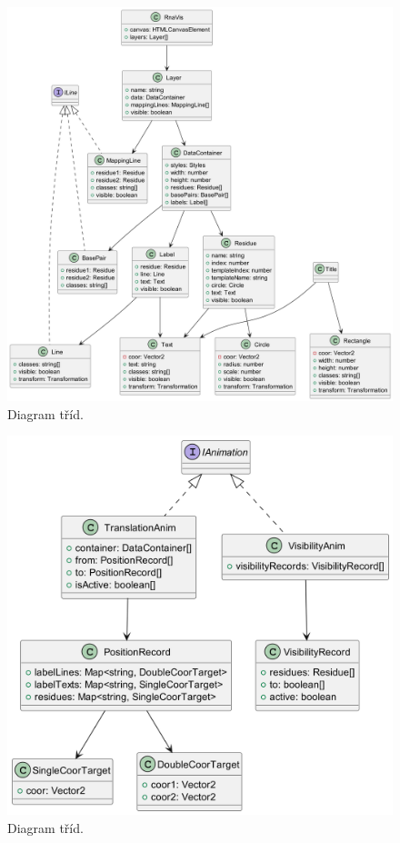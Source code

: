\begin{figure}[H]
  \centering
  \includegraphics[width=145mm]{../img/kap03/rnavis.png}
  \caption{Diagram tříd.}
\end{figure}

\begin{figure}[H]
  \centering
  \includegraphics[width=145mm]{../img/kap03/animation.png}
  \caption{Diagram tříd.}
\end{figure}

